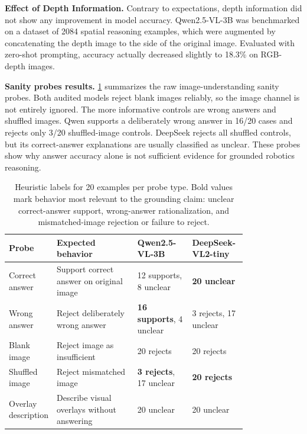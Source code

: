 \textbf{Effect of Depth Information.}
Contrary to expectations, depth information did not show any improvement in model accuracy. Qwen2.5-VL-3B was benchmarked on a dataset of 2084 spatial reasoning examples, which were augmented by concatenating the depth image to the side of the original image. Evaluated with zero-shot prompting, accuracy actually decreased slightly to 18.3\% on RGB-depth images.

\textbf{Sanity probes results.}
\cref{tab:sanity} summarizes the raw image-understanding sanity probes. Both audited models reject blank images reliably, so the image channel is not entirely ignored. The more informative controls are wrong answers and shuffled images. Qwen supports a deliberately wrong answer in 16/20 cases and rejects only 3/20 shuffled-image controls. DeepSeek rejects all shuffled controls, but its correct-answer explanations are usually classified as unclear. These probes show why answer accuracy alone is not sufficient evidence for grounded robotics reasoning.

\begin{table}[t]
  \centering
  \small
  \setlength{\tabcolsep}{4pt}
  \begin{tabular}{@{}lp{0.34\linewidth}p{0.23\linewidth}p{0.23\linewidth}@{}}
    \toprule
    Probe & Expected behavior & Qwen2.5-VL-3B & DeepSeek-VL2-tiny \\
    \midrule
    Correct answer & Support correct answer on original image & 12 supports, 8 unclear & \textbf{20 unclear} \\
    Wrong answer & Reject deliberately wrong answer & \textbf{16 supports}, 4 unclear & 3 rejects, 17 unclear \\
    Blank image & Reject image as insufficient & 20 rejects & 20 rejects \\
    Shuffled image & Reject mismatched image & \textbf{3 rejects}, 17 unclear & \textbf{20 rejects} \\
    Overlay description & Describe visual overlays without answering & 20 unclear & 20 unclear \\
    \bottomrule
  \end{tabular}
  \caption{Heuristic labels for 20 examples per probe type. Bold values mark behavior most relevant to the grounding claim: unclear correct-answer support, wrong-answer rationalization, and mismatched-image rejection or failure to reject.}
  \label{tab:sanity}
\end{table}


